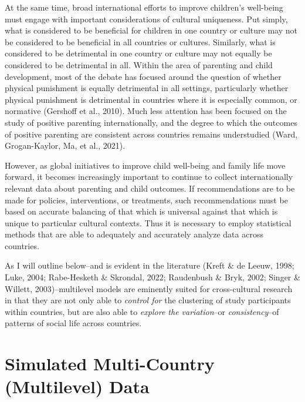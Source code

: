 \documentclass[
  letterpaper,
  DIV=11,
  numbers=noendperiod]{scrreprt}
\begin{document}
At the same time, broad international efforts to improve children's
well-being must engage with important considerations of cultural
uniqueness. Put simply, what is considered to be beneficial for children
in one country or culture may not be considered to be beneficial in all
countries or cultures. Similarly, what is considered to be detrimental
in one country or culture may not equally be considered to be
detrimental in all. Within the area of parenting and child development,
most of the debate has focused around the question of whether physical
punishment is equally detrimental in all settings, particularly whether
physical punishment is detrimental in countries where it is especially
common, or normative (Gershoff et al., 2010). Much less attention has
been focused on the study of positive parenting internationally, and the
degree to which the outcomes of positive parenting are consistent across
countries remains understudied (Ward, Grogan-Kaylor, Ma, et al., 2021).

However, as global initiatives to improve child well-being and family
life move forward, it becomes increasingly important to continue to
collect internationally relevant data about parenting and child
outcomes. If recommendations are to be made for policies, interventions,
or treatments, such recommendations must be based on accurate balancing
of that which is universal against that which is unique to particular
cultural contexts. Thus it is necessary to employ statistical methods
that are able to adequately and accurately analyze data across
countries.

As I will outline below--and is evident in the literature (Kreft \& de
Leeuw, 1998; Luke, 2004; Rabe-Hesketh \& Skrondal, 2022; Raudenbush \&
Bryk, 2002; Singer \& Willett, 2003)--multilevel models are eminently
suited for cross-cultural research in that they are not only able to
\emph{control for} the clustering of study participants within
countries, but are also able to \emph{explore the variation}--or
\emph{consistency}--of patterns of social life across countries.


\hypertarget{simulated-multi-country-multilevel-data}{%
\chapter{Simulated Multi-Country (Multilevel)
Data}\label{simulated-multi-country-multilevel-data}}
\end{document}
